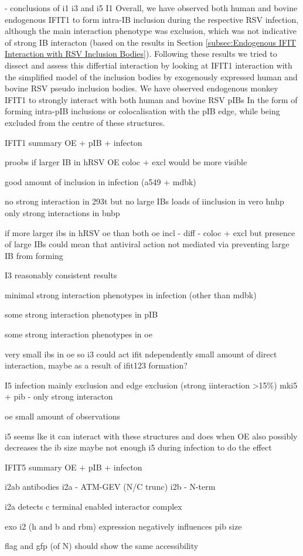 - conclusions of i1 i3 and i5
I1
Overall, we have observed both human and bovine endogenous IFIT1 to form intra-IB inclusion during the respective RSV infection, although the main interaction phenotype was exclusion, which was not indicative of strong IB interacton (based on the results in Section \ref{subsec:Endogenous IFIT Interaction with RSV Inclusion Bodies}). Following these results we tried to dissect and assess this differtial interaction by looking at IFIT1 interaction with the simplified model of the inclusion bodies by exogenously expressed human and bovine RSV pseudo inclusion bodies. We have observed endogenous monkey IFIT1 to strongly interact with both human and bovine RSV pIBs In the form of forming intra-pIB inclusions or colocalisation with the pIB edge, while being excluded from the centre of these structures. 


IFIT1 summary OE + pIB + infecton

proobs if larger IB in hRSV OE coloc + excl would be more visible


good amount of inclusion in infection (a549 + mdbk)

no strong interaction in 293t but no large IBs
loads of iinclusion in vero hnhp
only strong interactions in bnbp

if more larger ibs in hRSV oe than both oe incl -  diff - coloc + excl
but presence of large IBs could mean that antiviral action not mediated via preventing large IB from forming

I3
reasonably consistent results

minimal strong interaction phenotypes in infection (other than mdbk)

some strong interaction phenotypes in pIB

some strong interaction phenotypes in oe


very small ibs in oe so i3 could act ifit ndependently
small amount of direct interaction, maybe as a result of ifit123 formation?

I5
infection mainly exclusion and edge exclusion (strong iinteraction >15\%)
mki5 + pib - only strong interacton

oe small amount of observations

i5 seems lke it can interact with these structures and does when OE
also possibly decreases the ib size
maybe not enough i5 during infection to do the effect

IFIT5 summary OE + pIB + infecton





i2ab antibodies
i2a - ATM-GEV (N/C trunc)
i2b - N-term

i2a detects c terminal enabled interactor complex


exo i2 (h and b and rbm) expression negatively influences pib size


flag and gfp (of N) should show the same accessibility